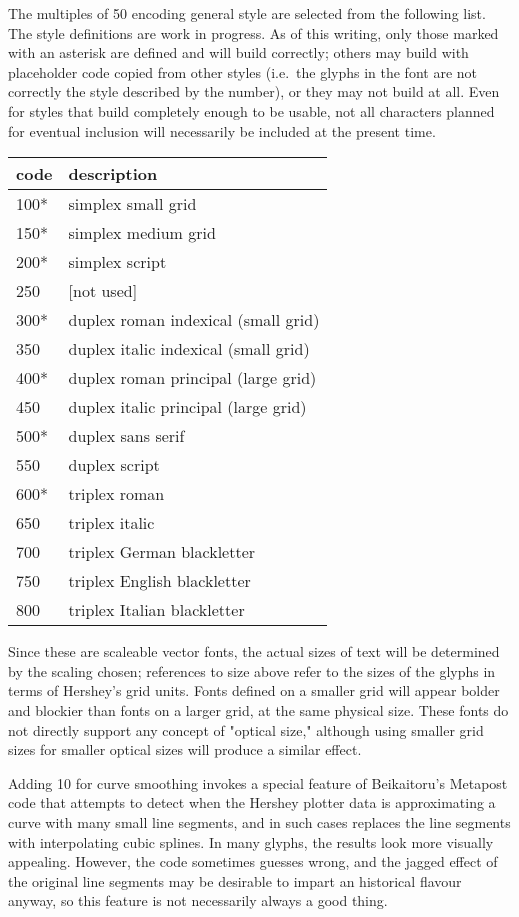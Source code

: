 \documentclass{article}
\begin{document}
The multiples of 50 encoding general style are selected from the following
list.  The style definitions are work in progress.  As of this writing, only
those marked with an asterisk are defined and will build correctly; others
may build with placeholder code copied from other styles (i.e.\ the glyphs
in the font are not correctly the style described by the number), or they
may not build at all.  Even for styles that build completely enough to be
usable, not all characters planned for eventual inclusion will necessarily
be included at the present time.

\begin{tabular}{ll}
  code & description \\ \hline
  100* & simplex small grid \\
  150* & simplex medium grid \\
  200* & simplex script \\
  250 & [not used] \\
  300* & duplex roman indexical (small grid) \\
  350 & duplex italic indexical (small grid) \\
  400* & duplex roman principal (large grid) \\
  450 & duplex italic principal (large grid) \\
  500* & duplex sans serif \\
  550 & duplex script \\
  600* & triplex roman \\
  650 & triplex italic \\
  700 & triplex German blackletter \\
  750 & triplex English blackletter \\
  800 & triplex Italian blackletter
\end{tabular}

Since these are scaleable vector fonts, the actual sizes of text will be
determined by the scaling chosen; references to size above refer to the
sizes of the glyphs in terms of Hershey's grid units.  Fonts defined on a
smaller grid will appear bolder and blockier than fonts on a larger grid, at
the same physical size.  These fonts do not directly support any concept of
"optical size," although using smaller grid sizes for smaller optical sizes
will produce a similar effect.

Adding 10 for curve smoothing invokes a special feature of Beikaitoru's
Metapost code that attempts to detect when the Hershey plotter data is
approximating a curve with many small line segments, and in such cases
replaces the line segments with interpolating cubic splines.  In many
glyphs, the results look more visually appealing.  However, the code
sometimes guesses wrong, and the jagged effect of the original line segments
may be desirable to impart an historical flavour anyway, so this feature is
not necessarily always a good thing.
\end{document}
